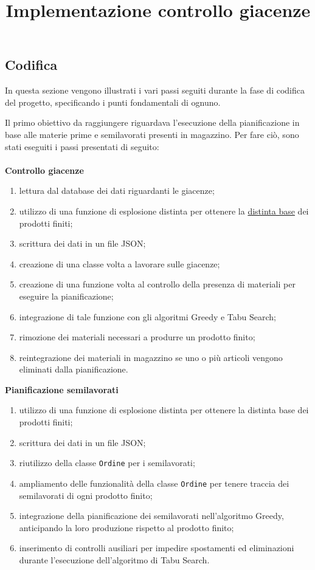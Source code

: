 \subsection{Codifica}

In questa sezione vengono illustrati i vari passi seguiti durante la fase di codifica del progetto, specificando i punti fondamentali di ognuno.\\

\title{Implementazione controllo giacenze}

Il primo obiettivo da raggiungere riguardava l'esecuzione della pianificazione in base alle materie prime e semilavorati presenti in magazzino.
Per fare ciò, sono stati eseguiti i passi presentati di seguito:\\ \\
\textbf{Controllo giacenze}
\begin{enumerate}
        \item lettura dal database dei dati riguardanti le giacenze;
        \item utilizzo di una funzione di esplosione distinta per ottenere la \hyperref[Distinta base]{distinta base\glo} dei prodotti finiti; 
        \item scrittura dei dati in un file JSON;
        \item creazione di una classe volta a lavorare sulle giacenze;
        \item creazione di una funzione volta al controllo della presenza di materiali per eseguire la pianificazione;
        \item integrazione di tale funzione con gli algoritmi Greedy e Tabu Search;
        \item rimozione dei materiali necessari a produrre un prodotto finito;
        \item reintegrazione dei materiali in magazzino se uno o più articoli vengono eliminati dalla pianificazione.\\
\end{enumerate}

\textbf{Pianificazione semilavorati} 
\begin{enumerate}
        \item utilizzo di una funzione di esplosione distinta per ottenere la distinta base dei prodotti finiti; 
        \item scrittura dei dati in un file JSON;
        \item riutilizzo della classe \texttt{Ordine} per i semilavorati;
        \item ampliamento delle funzionalità della classe \texttt{Ordine} per tenere traccia dei semilavorati di ogni prodotto finito;
        \item integrazione della pianificazione dei semilavorati nell'algoritmo Greedy, anticipando la loro produzione rispetto al prodotto finito;
        \item inserimento di controlli ausiliari per impedire spostamenti ed eliminazioni durante l'esecuzione dell'algoritmo di Tabu Search.\\
\end{enumerate}

